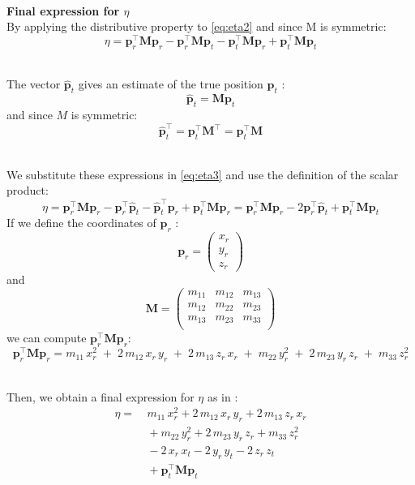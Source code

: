 \documentclass[main]{subfiles}
\begin{document}
\noindent\\
\textbf{Final expression for $\eta$}\noindent\\
By applying the distributive property to \ref{eq:eta2} and since M is symmetric:
\begin{equation}
    \eta = \mathbf{p}_r^\top \mathbf{M} \mathbf{p}_r - \mathbf{p}_r^\top \mathbf{M} \mathbf{p}_t - \mathbf{p}_t^\top \mathbf{M} \mathbf{p}_r+ \mathbf{p}_t^\top \mathbf{M} \mathbf{p}_t
    \label{eq:eta3}
\end{equation}

\noindent\\
The vector $\mathbf{\hat{p}}_t$ gives an estimate of the true position $\mathbf{p}_t$ :
\[
\mathbf{\hat{p}}_t = \mathbf{M} \mathbf{p}_t
\]
and since $M$ is symmetric:
\[
\mathbf{\hat{p}}_t^\top =  \mathbf{p}_t^\top \mathbf{M}^\top = \mathbf{p}_t^\top \mathbf{M}
\]

\noindent\\
We substitute these expressions in \ref{eq:eta3} and use the definition of the scalar product:
\[
\eta = \mathbf{p}_r^\top \mathbf{M} \mathbf{p}_r - \mathbf{p}_r^\top \mathbf{\hat{p}}_t - \mathbf{\hat{p}}_t^\top \mathbf{p}_r+ \mathbf{p}_t^\top \mathbf{M} \mathbf{p}_r = \mathbf{p}_r^\top \mathbf{M} \mathbf{p}_r - 2 \mathbf{p}_r^\top \mathbf{\hat{p}}_t + \mathbf{p}_t^\top \mathbf{M} \mathbf{p}_t
\]
If we define the coordinates of $\mathbf{p}_r$ :
\[
\mathbf{p}_r = \begin{pmatrix}
    x_r \\
    y_r \\
    z_r
\end{pmatrix}
\]
and
\[
    \mathbf{M} = \begin{pmatrix}
    m_{11} & m_{12} & m_{13} \\
    m_{12} & m_{22} & m_{23} \\
    m_{13} & m_{23} & m_{33} \\
\end{pmatrix}
\]
we can compute $\mathbf{p}_r^\top \mathbf{M} \mathbf{p}_r$:
\[
\mathbf{p}_r^\top \mathbf{M} \mathbf{p}_r = 
m_{11} \, x_r^2 \; + \; 2 \, m_{12} \, x_r \, y_r \; + \; 2 \, m_{13} \, z_r \, x_r \; + \;
m_{22} \, y_r^2 \; + \; 2 \, m_{23} \, y_r \, z_r \; + \; m_{33} \, z_r^2
\]

\noindent\\
Then, we obtain a final expression for $\eta$ as in \cite{main}:
\begin{equation}
\begin{aligned}
\eta = & \ m_{11} \, x_r^2 + 2 \, m_{12} \, x_r \, y_r + 2 \, m_{13} \, z_r \, x_r \\
       & \ + m_{22} \, y_r^2 + 2 \, m_{23} \, y_r \, z_r + m_{33} \, z_r^2 \\
       & \ - 2 \, x_r \, x_t - 2 \, y_r \, y_t - 2 \, z_r \, z_t \\
       & \ + \mathbf{p}_t^\top \mathbf{M} \mathbf{p}_t
\end{aligned}
\label{eq:eta_final}
\end{equation}
\end{document}
